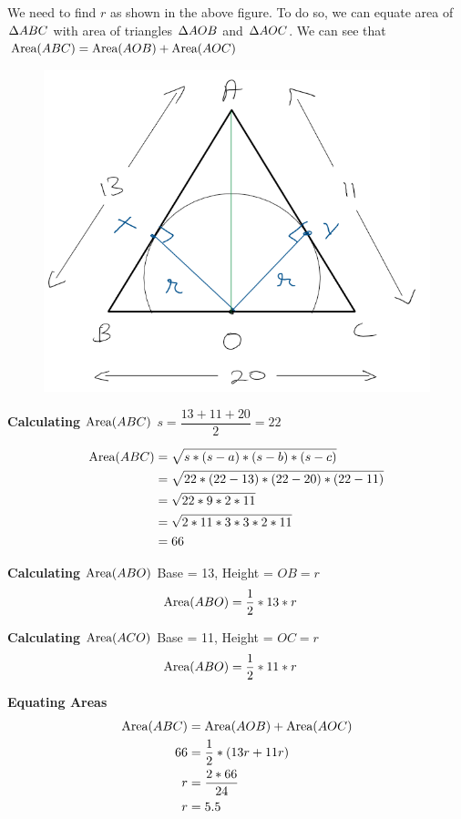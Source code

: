 We need to find $r$ as shown in the above figure. To do so, we can equate area of $\Delta {A}BC$ with area of triangles $\Delta {A}OB$ and $\Delta {A}OC$. We can see that $ \text{Area}({ABC}) = \text{Area}({AOB}) + \text{Area}({AOC}) $

\begin{figure}[h!]
    \centering
    \includegraphics[width=0.5\linewidth]{Quant//Geometry//Images//Triangles/area_of_triangle_question_4_sol_fig.png}
\end{figure}

\textbf{Calculating $\text{Area}({ABC})$}
$s = \dfrac{13 + 11 + 20}{2} = 22$

\begin{align*}
    \text{Area}({ABC}) &= \sqrt{s * (s - a) * (s - b) * (s - c)} \\
    &= \sqrt{22 * (22 - 13) * (22 - 20) * (22 - 11)} \\
    &= \sqrt{22 * 9 * 2 * 11} \\
    &= \sqrt{2 * 11 * 3 * 3 * 2 * 11} \\
    &= 66
\end{align*}

\textbf{Calculating $\text{Area}({ABO})$}
Base = 13, Height = $OB = r$
\begin{align*}
    \text{Area}({ABO}) &= \dfrac{1}{2} * 13 * r
\end{align*}

\textbf{Calculating $\text{Area}({ACO})$}
Base = 11, Height = $OC = r$
\begin{align*}
    \text{Area}({ABO}) &= \dfrac{1}{2} * 11 * r
\end{align*}

\textbf{Equating Areas}
\begin{align*}
    \text{Area}({ABC}) &= \text{Area}({AOB}) + \text{Area}({AOC}) \\
    66 &= \dfrac{1}{2} * (13r + 11r) \\
    r &= \dfrac{2 * 66}{24} \\
    r &= 5.5
\end{align*}

